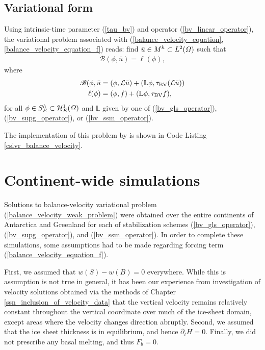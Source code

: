 \subsection{Variational form}

Using intrinsic-time parameter (\ref{tau_bv}) and operator (\ref{bv_linear_operator}), the variational problem associated with (\ref{balance_velocity_equation}, \ref{balance_velocity_equation_f}) reads: find $\bar{u} \in M^h \subset L^2(\varOmega)$ such that
\begin{align}
  \label{balance_velocity_weak_problem}
  \mathscr{B}(\phi, \bar{u}) = \ell(\phi),
\end{align}
where
\begin{align*}
  \mathscr{B}(\phi, \bar{u} &= (\phi, \mathcal{L} \bar{u}) + (\mathbb{L} \phi, \tau_{\text{BV}}(\mathcal{L}\bar{u})) \\
  \ell(\phi) &= (\phi, f) + (\mathbb{L} \phi, \tau_{\text{BV}}f),
\end{align*}
for all $\phi \in S_E^h \subset \mathcal{H}_E^1(\varOmega)$ and $\mathbb{L}$ given by one of (\ref{bv_gls_operator}), (\ref{bv_supg_operator}), or (\ref{bv_ssm_operator}).

The implementation of this problem by \CSLVR is shown in Code Listing \ref{cslvr_balance_velocity}.


\section{Continent-wide simulations} \label{ssn_balance_velocity_simulations}

Solutions to balance-velocity variational problem (\ref{balance_velocity_weak_problem}) were obtained over the entire continents of Antarctica and Greenland for each of stabilization schemes (\ref{bv_gls_operator}), (\ref{bv_supg_operator}), and (\ref{bv_ssm_operator}).  In order to complete these simulations, some assumptions had to be made regarding forcing term (\ref{balance_velocity_equation_f}).

First, we assumed that $w(S) - w(B) = 0$ everywhere.  While this is assumption is not true in general, it has been our experience from investigation of velocity solutions obtained via the methods of Chapter \ref{ssn_inclusion_of_velocity_data} that the vertical velocity remains relatively constant throughout the vertical coordinate over much of the ice-sheet domain, except areas where the velocity changes direction abruptly.  Second, we assumed that the ice sheet thickness is in equilibrium, and hence $\partial_t H = 0$.  Finally, we did not prescribe any basal melting, and thus $F_b = 0$.

